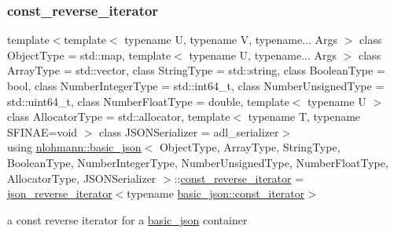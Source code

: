 \subsubsection{\texorpdfstring{const\_reverse\_iterator}{const\_reverse\_iterator}}
{\footnotesize\ttfamily template$<$template$<$ typename U, typename V, typename... Args $>$ class Object\+Type = std\+::map, template$<$ typename U, typename... Args $>$ class Array\+Type = std\+::vector, class String\+Type  = std\+::string, class Boolean\+Type  = bool, class Number\+Integer\+Type  = std\+::int64\+\_\+t, class Number\+Unsigned\+Type  = std\+::uint64\+\_\+t, class Number\+Float\+Type  = double, template$<$ typename U $>$ class Allocator\+Type = std\+::allocator, template$<$ typename T, typename S\+F\+I\+N\+A\+E=void $>$ class J\+S\+O\+N\+Serializer = adl\+\_\+serializer$>$ \\
using \mbox{\hyperlink{classnlohmann_1_1basic__json}{nlohmann\+::basic\+\_\+json}}$<$ Object\+Type, Array\+Type, String\+Type, Boolean\+Type, Number\+Integer\+Type, Number\+Unsigned\+Type, Number\+Float\+Type, Allocator\+Type, J\+S\+O\+N\+Serializer $>$\+::\mbox{\hyperlink{classnlohmann_1_1basic__json_a72be3c24bfa24f0993d6c11af03e7404}{const\+\_\+reverse\+\_\+iterator}} =  \mbox{\hyperlink{classnlohmann_1_1basic__json_1_1json__reverse__iterator}{json\+\_\+reverse\+\_\+iterator}}$<$typename \mbox{\hyperlink{classnlohmann_1_1basic__json_a41a70cf9993951836d129bb1c2b3126a}{basic\+\_\+json\+::const\+\_\+iterator}}$>$}



a const reverse iterator for a \mbox{\hyperlink{classnlohmann_1_1basic__json}{basic\+\_\+json}} container 

\mbox{\label{classnlohmann_1_1basic__json_afe7c1303357e19cea9527af4e9a31d8f}} 
